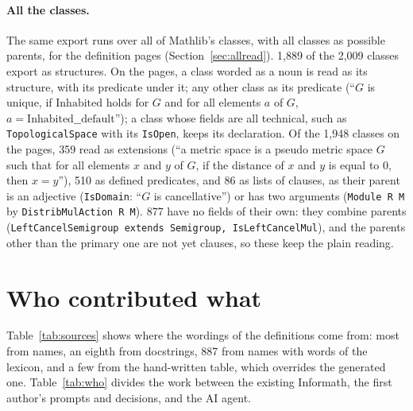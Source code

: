 \documentclass{easychair}
\newcommand{\ttt}[1]{\texttt{#1}}
\begin{document}
\paragraph{All the classes.} The same export runs over all of Mathlib's classes, with all classes
as possible parents, for the definition pages (Section~\ref{sec:allread}). 1,889 of the 2,009
classes export as structures. On the pages, a class worded as a noun is read as its structure,
with its predicate under it; any other class as its predicate (``$G$ is unique, if
$\mathrm{Inhabited}$ holds for $G$ and for all elements $a$ of $G$, $a =
\mathrm{Inhabited\_\_default}$'');
a class whose fields are all technical, such as \ttt{TopologicalSpace} with its \ttt{IsOpen},
keeps its declaration. Of the 1,948 classes on the pages, 359 read as extensions (``a metric
space is a pseudo metric space $G$ such that for all elements $x$ and $y$ of $G$, if the
distance of $x$ and $y$ is equal to $0$, then $x = y$''), 510 as defined predicates, and 86 as
lists of clauses, as their parent is an adjective (\ttt{IsDomain}: ``$G$ is cancellative'') or
has two arguments (\ttt{Module R M} by \ttt{DistribMulAction R M}). 877 have no fields of their
own: they combine parents (\ttt{LeftCancelSemigroup extends Semigroup, IsLeftCancelMul}), and
the parents other than the primary one are not yet clauses, so these keep the plain reading.

\section{Who contributed what}
\label{sec:who}

Table~\ref{tab:sources} shows where the wordings of the definitions come from: most from names,
an eighth from docstrings, 887 from names with words of the lexicon, and a few from the
hand-written table, which overrides the
generated one. Table~\ref{tab:who} divides the work between the existing Informath, the first
author's prompts and decisions, and the AI agent.
\end{document}
